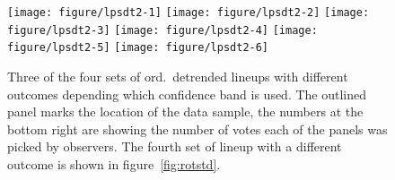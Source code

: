 \documentclass[12pt]{article}\usepackage[]{graphicx}\usepackage[]{color}
\newenvironment{knitrout}{}{} %
\newcommand{\HH}[1]{{\color{orange} #1}}
\begin{document}
\begin{appendix}
\begin{figure}
\centering
\begin{knitrout}
\color{fgcolor}
\texttt{[image: figure/lpsdt2-1]} 
\texttt{[image: figure/lpsdt2-2]} 
\texttt{[image: figure/lpsdt2-3]} 
\texttt{[image: figure/lpsdt2-4]} 
\texttt{[image: figure/lpsdt2-5]} 
\texttt{[image: figure/lpsdt2-6]} 

\end{knitrout}
\caption{\label{fig:lpsdt2} Three of the  four sets of \HH{ord.\ detrended}  lineups with different outcomes depending which confidence band is used. The outlined panel marks the  location of the data sample, the numbers at the bottom right are showing the number of votes each of the panels was picked by observers. The fourth set of lineup with a different outcome is shown in figure~\ref{fig:rotstd}. }
\end{figure}
\afterpage{\clearpage}








\end{appendix}
\end{document}

